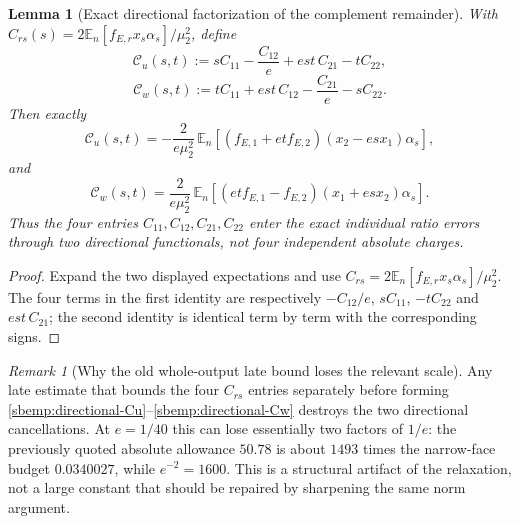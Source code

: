 \documentclass{article} %
\theoremstyle{plain}
\newtheorem{lemma}[theorem]{Lemma}
\theoremstyle{definition}
\theoremstyle{remark}
\newtheorem{remark}[theorem]{Remark}
\begin{document}
\begin{lemma}[Exact directional factorization of the complement remainder]
\label{sbemp:directional-complement}
With $C_{rs}(s)=2\mathbb E_n[f_{E,r}x_s\alpha_s]/\mu_2^2$, define
\[
 \mathcal C_u(s,t)
 :=sC_{11}-\frac{C_{12}}e+est\,C_{21}-tC_{22},
\]
\[
 \mathcal C_w(s,t)
 :=tC_{11}+est\,C_{12}-\frac{C_{21}}e-sC_{22}.
\]
Then exactly
\[
\boxed{
 \mathcal C_u(s,t)
 =-\frac{2}{e\mu_2^2}\,
 \mathbb E_n\!\left[
 (f_{E,1}+etf_{E,2})(x_2-esx_1)\alpha_s
 \right],
}
\tag{directional-Cu}\label{sbemp:directional-Cu}
\]
and
\[
\boxed{
 \mathcal C_w(s,t)
 =\frac{2}{e\mu_2^2}\,
 \mathbb E_n\!\left[
 (etf_{E,1}-f_{E,2})(x_1+esx_2)\alpha_s
 \right].
}
\tag{directional-Cw}\label{sbemp:directional-Cw}
\]
Thus the four entries $C_{11},C_{12},C_{21},C_{22}$ enter the exact individual
ratio errors through two directional functionals, not four independent
absolute charges.
\end{lemma}
\begin{proof}
Expand the two displayed expectations and use
$C_{rs}=2\mathbb E_n[f_{E,r}x_s\alpha_s]/\mu_2^2$.  The four terms in the
first identity are respectively
$-C_{12}/e$, $sC_{11}$, $-tC_{22}$ and $est\,C_{21}$; the second identity is
identical term by term with the corresponding signs.
\end{proof}

\begin{remark}[Why the old whole-output late bound loses the relevant scale]
\label{rem:directional-50}
Any late estimate that bounds the four $C_{rs}$ entries separately before
forming \eqref{sbemp:directional-Cu}--\eqref{sbemp:directional-Cw} destroys
the two directional cancellations.  At $e=1/40$ this can lose essentially
two factors of $1/e$: the previously quoted absolute allowance $50.78$ is
about $1493$ times the narrow-face budget $0.0340027$, while $e^{-2}=1600$.
This is a structural artifact of the relaxation, not a large constant that
should be repaired by sharpening the same norm argument.
\end{remark}
\end{document}
